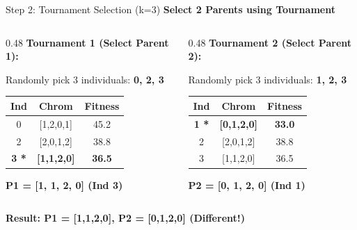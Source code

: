 \documentclass[aspectratio=169,10pt]{beamer}
\begin{document}
\begin{frame}{Step 2: Tournament Selection (k=3)}
  \colorbox{navymid}{\color{teallt}\bfseries Select 2 Parents using Tournament}
  
  \vspace{0.3cm}
  \begin{columns}[T]
    \begin{column}{0.48\textwidth}
      \textbf{Tournament 1 (Select Parent 1):}
      
      \vspace{0.2cm}
      {\small Randomly pick 3 individuals: \textbf{0, 2, 3}}
      
      \vspace{0.2cm}
      \begin{tabular}{ccc}
        \toprule
        \rowcolor{navymid}
        \color{white}\textbf{Ind} & \color{white}\textbf{Chrom} & \color{white}\textbf{Fitness} \\
        \midrule
        0 & [1,2,0,1] & 45.2 \\
        2 & [2,0,1,2] & 38.8 \\
        \rowcolor{lightgreen}
        \textbf{3 *} & \textbf{[1,1,2,0]} & \cellcolor{mygreen}\color{white}\textbf{36.5} \\
        \bottomrule
      \end{tabular}
      
      \vspace{0.2cm}
      \colorbox{mygreen}{\color{white}\bfseries P1 = [1, 1, 2, 0] (Ind 3)}
    \end{column}
    
    \begin{column}{0.48\textwidth}
      \textbf{Tournament 2 (Select Parent 2):}
      
      \vspace{0.2cm}
      {\small Randomly pick 3 individuals: \textbf{1, 2, 3}}
      
      \vspace{0.2cm}
      \begin{tabular}{ccc}
        \toprule
        \rowcolor{navymid}
        \color{white}\textbf{Ind} & \color{white}\textbf{Chrom} & \color{white}\textbf{Fitness} \\
        \midrule
        \rowcolor{lightgreen}
        \textbf{1 *} & \textbf{[0,1,2,0]} & \cellcolor{mygreen}\color{white}\textbf{33.0} \\
        2 & [2,0,1,2] & 38.8 \\
        3 & [1,1,2,0] & 36.5 \\
        \bottomrule
      \end{tabular}
      
      \vspace{0.2cm}
      \colorbox{mygreen}{\color{white}\bfseries P2 = [0, 1, 2, 0] (Ind 1)}
    \end{column}
  \end{columns}
  
  \vspace{0.4cm}
  \colorbox{amber}{\color{white}\bfseries Result: P1 = [1,1,2,0], P2 = [0,1,2,0] (Different!)}
\end{frame}
\end{document}
